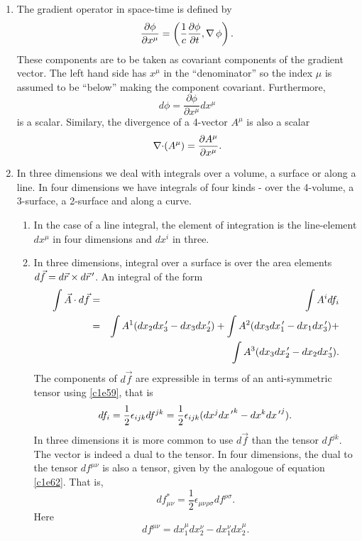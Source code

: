 \begin{enumerate}
\item The gradient operator in space-time is defined by
\begin{equation}\label{c1e65}
\frac{\partial\phi}{\partial x^\mu} = 
\left(\frac{1}{c}\frac{\partial\phi}{\partial t}, \operatorname{\nabla}\phi\right).
\end{equation}
These components are to be taken as covariant components of the gradient vector.
The left hand side has $x^\mu$ in the ``denominator'' so the index $\mu$ is assumed
to be ``below'' making the component covariant. Furthermore,
\begin{equation}\label{c1e66}
d\phi = \frac{\partial\phi}{\partial x^\mu}dx^\mu
\end{equation}
is a scalar. Similary, the divergence of a 4-vector $A^\mu$ is also a scalar
\begin{equation}\label{c1e67}
\operatorname{\nabla\cdot}(A^\mu) = \frac{\partial A^\mu}{\partial x^\mu}.
\end{equation}

\item In three dimensions we deal with integrals over a volume, a surface or
along a line. In four dimensions we have integrals of four kinds - over the
4-volume, a 3-surface, a 2-surface and along a curve.
\begin{enumerate}
\item In the case of a line integral, the element of integration is the line-element
$dx^\mu$ in four dimensions and $dx^i$ in three.

\item In three dimensions, integral over a surface is over the area elements 
$d\vec{f} = d\vec{r} \times d\vec{r}^{\,\prime}$. An integral of the form
\begin{eqnarray*}
\int \vec{A}\cdot d\vec{f} &=& \int A^i df_i \\
 &=& \int A^1(dx_2dx_3^{\,\prime} - dx_3dx_2^{\,\prime}) + \int A^2(dx_3dx_1^{\,\prime} - dx_1dx_3^{\,\prime}) + \\
 & & \int A^3(dx_3dx_2^{\,\prime} - dx_2dx_3^{\,\prime}).
\end{eqnarray*}
The components of $d\vec{f}$ are expressible in terms of an anti-symmetric tensor 
using \eqref{c1e59}, that is
\begin{equation}\label{c1e68}
df_i = \frac{1}{2}\epsilon_{ijk}df^{jk} = \frac{1}{2}\epsilon_{ijk}(dx^jd{x^{\,\prime}}^k - 
dx^kd{x^{\,\prime}}^j).
\end{equation}
In three dimensions it is more common to use $d\vec{f}$ than the tensor $df^{jk}$.
The vector is indeed a dual to the tensor. In four dimensions, the dual to the
tensor $df^{\mu\nu}$ is also a tensor, given by the analogoue of equation \eqref{c1e62}. 
That is,
\begin{equation}\label{c1e69}
df^\ast_{\mu\nu} = \frac{1}{2}\epsilon_{\mu\nu\rho\sigma}df^{\rho\sigma}.
\end{equation}
Here
\begin{equation}\label{c1e70}
df^{\mu\nu} = dx_1^\mu dx_2^\nu - dx_1^\nu dx_2^\mu.
\end{equation}


\end{enumerate}
\end{enumerate}
